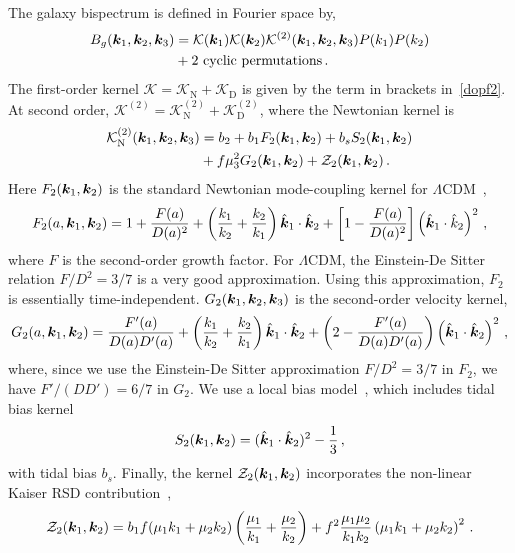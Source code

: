 The galaxy bispectrum is defined in Fourier space by,
\begin{align}
B_{g}( \bm{k}_{1},  \bm{k}_{2},  \bm {k}_3) &= { \mathcal{K}( \bm {k}_{1})\mathcal{K}({\bm {k}}_{2}) \mathcal{K}^{(2)}(  \bm{k}_{1},  \bm{k}_{2}, \bm {k}_3)}
P(k_{1})P(k_{2}) \nonumber\\ 
&+\text{2 cyclic permutations}\,.\label{eq:fsbispdef}
\end{align}
The first-order kernel $\mathcal{K}=\mathcal{K}_{\mathrm{N}}+\mathcal{K}_{\mathrm{D}}$ is given by the term in brackets in~\eqref{dopf2}.
At second order, $\mathcal{K}^{(2)}=\mathcal{K}_{\mathrm{N}}^{(2)}+\mathcal{K}_{\mathrm{D}}^{(2)}$, where
 the Newtonian kernel is~\citep{Verde:1998zr}
\begin{align}
\mathcal{K}_{\mathrm{N}}^{(2)} (\bm {k}_1,\bm {k}_2,\bm {k}_3) &= b_{2} + b_{1}F_{2}(\bm {k}_1,\bm {k}_2) + b_s S_{2}(\bm {k}_1,\bm {k}_2) \nonumber \\
& + f \mu_3^{2} G_{2}(\bm {k}_1,\bm {k}_2)
+ {\cal Z}_2(\bm {k}_1,\bm {k}_2)\,.   \label{kn2}  
\end{align}
Here $F_2(\bm {k}_1,\bm {k}_2)$ is the standard Newtonian mode-coupling kernel for $\Lambda$CDM~\citep{Villa:2015ppa}, 
\begin{equation}
    F_2(a,\bm {k}_1,\bm {k}_2) = 1 + \frac{F(a)}{D(a)^2} + \left( \frac{k_1}{k_2} + \frac{k_2}{k_1} \right) \hat{\bm {k}}_1 \cdot \hat{\bm {k}}_2 + \left[ 1 - \frac{F(a)}{D(a)^2} \right]\left( \hat{\bm {k}}_1 \cdot \hat{k}_2 \right)^2\,,
\end{equation}
where $F$ is the second-order growth factor. For $\Lambda$CDM, the Einstein-De Sitter relation $F/D^2 = 3/7$ is a very good approximation. Using this approximation, $F_2$ is essentially time-independent. $G_2({\bm {k}_{1}},  {\bm {k}_{2}},\bm {k}_3)$ is the second-order velocity kernel, 
\begin{equation}
    G_2(a,\bm {k}_1,\bm {k}_2) = \frac{F'(a)}{D(a) D'(a)} + \left( \frac{k_1}{k_2} + \frac{k_2}{k_1} \right) \hat{\bm {k}}_1 \cdot \hat{\bm {k}}_2 + \left( 2 - \frac{F'(a)}{D(a) D'(a)} \right) \left( \hat{\bm {k}}_1 \cdot \hat{\bm {k}}_2 \right)^2\,,
\end{equation}
where, since we use the Einstein-De Sitter approximation $F/D^2 = 3/7$ in $F_2$, we have $F'/(D D') = 6/7$ in $G_2$. We use a local bias model~\citep{Desjacques:2016bnm}, which includes tidal bias kernel
\begin{equation}
    S_2(\bm {k}_1,\bm {k}_2) = (\hat{\bm {k}}_1 \cdot \hat{\bm {k}}_2)^2 - \frac{1}{3}\,, 
\end{equation}
with tidal bias $b_s$. Finally, the kernel $\mathcal{Z}_2(\bm {k}_1,\bm {k}_2)$ incorporates the non-linear Kaiser RSD contribution~\citep{Verde:1998zr,Scoccimarro:1999ed}, 
\begin{equation}
    \mathcal{Z}_2(\bm {k}_1,\bm {k}_2) = b_1 f (\mu_1 k_1 + \mu_2 k_2) \left( \frac{\mu_1}{k_1} + \frac{\mu_2}{k_2} \right) + f^2 \frac{\mu_1 \mu_2}{k_1 k_2} \left( \mu_1 k_1 + \mu_2 k_2 \right)^2\,.
\end{equation}

